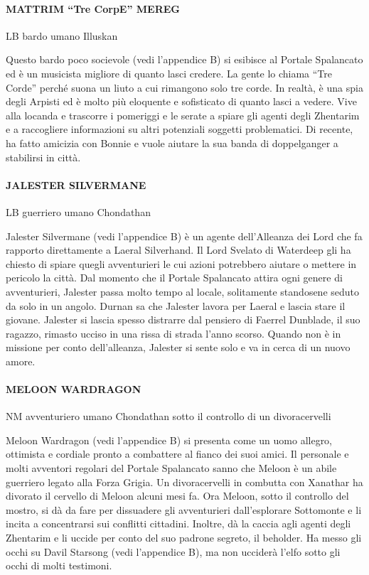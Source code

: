 \documentclass{article}
\begin{document}
                \paragraph{MATTRIM “Tre CorpE” MEREG}
LB bardo umano Illuskan

Questo bardo poco socievole (vedi l'appendice B) si esibisce al Portale Spalancato ed è un musicista migliore di quanto lasci credere. La gente lo chiama “Tre Corde” perché suona un liuto a cui rimangono solo tre corde. In realtà, è una spia degli Arpisti ed è molto più eloquente e sofisticato di quanto lasci a vedere. Vive alla locanda e trascorre i pomeriggi e le serate a spiare gli agenti degli Zhentarim e a raccogliere informazioni su altri potenziali soggetti problematici. Di recente, ha fatto amicizia con Bonnie e vuole aiutare la sua banda di doppelganger a stabilirsi in città.

                \paragraph{JALESTER SILVERMANE}
LB guerriero umano Chondathan

Jalester Silvermane (vedi l'appendice B) è un agente dell'Alleanza dei Lord che fa rapporto direttamente a Laeral Silverhand. Il Lord Svelato di Waterdeep gli ha chiesto di spiare quegli avventurieri le cui azioni potrebbero aiutare o mettere in pericolo la città. Dal momento che il Portale Spalancato attira ogni genere di avventurieri, Jalester passa molto tempo al locale, solitamente standosene seduto da solo in un angolo. Durnan sa che Jalester lavora per Laeral e lascia stare il giovane. Jalester si lascia spesso distrarre dal pensiero di Faerrel Dunblade, il suo ragazzo, rimasto ucciso in una rissa di strada l’anno scorso. Quando non è in missione per conto dell'alleanza, Jalester si sente solo e va in cerca di un nuovo amore.

                \paragraph{MELOON WARDRAGON}
NM avventuriero umano Chondathan sotto il controllo di un divoracervelli

Meloon Wardragon (vedi l'appendice B) si presenta come un uomo allegro, ottimista e cordiale pronto a combattere al fianco dei suoi amici. Il personale e molti avventori regolari del Portale Spalancato sanno che Meloon è un abile guerriero legato alla Forza Grigia. Un divoracervelli in combutta con Xanathar ha divorato il cervello di Meloon alcuni mesi fa. Ora Meloon, sotto il controllo del mostro, si dà da fare per dissuadere gli avventurieri dall'esplorare Sottomonte e li incita a concentrarsi sui conflitti cittadini. Inoltre, dà la caccia agli agenti degli Zhentarim e li uccide per conto del suo padrone segreto, il beholder. Ha messo gli occhi su Davil Starsong (vedi l'appendice B), ma non ucciderà l’elfo sotto gli occhi di molti testimoni.
\end{document}
